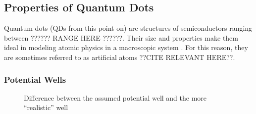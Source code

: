 \documentclass[authoryearcitations]{UoYCSproject}
\begin{document}
\subsection{Properties of Quantum Dots}
Quantum dots (QDs from this point on) are structures of semiconductors ranging between ??????
RANGE HERE ??????. Their size and properties make them ideal in modeling atomic physics in a
macroscopic system \cite{Li}. For this reason, they are sometimes referred to as artificial atoms 
??CITE RELEVANT HERE??.

\subsubsection{Potential Wells}

\begin{figure}[h]
  \centering
  \hspace{0.5 in}
    \caption{Difference between the assumed potential well and the more ``realistic'' well}
    \label{potWells}
\end{figure}
\end{document}
